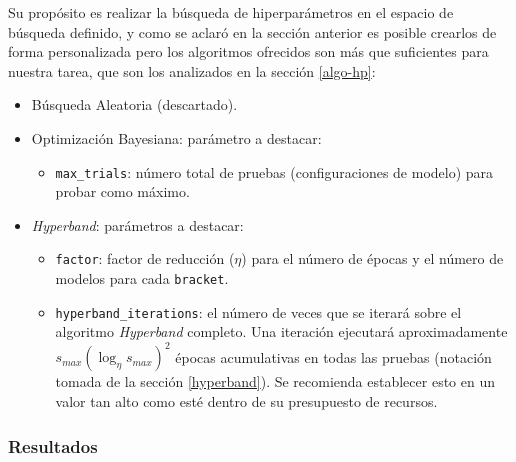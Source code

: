 \documentclass[a4paper,12pt]{article}
\begin{document}
Su propósito es realizar la búsqueda de hiperparámetros en el espacio de búsqueda definido, y como se aclaró en la sección anterior es posible crearlos de forma personalizada pero los algoritmos ofrecidos son más que suficientes para nuestra tarea, que son los analizados en la sección \ref{algo-hp}:
\begin{itemize}
	\item Búsqueda Aleatoria (descartado).
	\item Optimización Bayesiana: parámetro a destacar:
	\begin{itemize}
		\item \texttt{max\_trials}: número total de pruebas (configuraciones de modelo) para probar como máximo.
	\end{itemize}
	\item \textit{Hyperband}: parámetros a destacar:
	\begin{itemize}
		\item \texttt{factor}: factor de reducción ($\eta$) para el número de épocas y el número de modelos para cada \texttt{bracket}.
		\item \texttt{hyperband\_iterations}: el número de veces que se iterará sobre el algoritmo \textit{Hyperband} completo. Una iteración ejecutará aproximadamente $s_{max}(\log_{\eta} s_{max})^2$ épocas acumulativas en todas las pruebas (notación tomada de la sección \ref{hyperband}). Se recomienda establecer esto en un valor tan alto como esté dentro de su presupuesto de recursos.
	\end{itemize}
\end{itemize}

\subsubsection{Resultados}

\clearpage

{}

%
%
\end{document}
